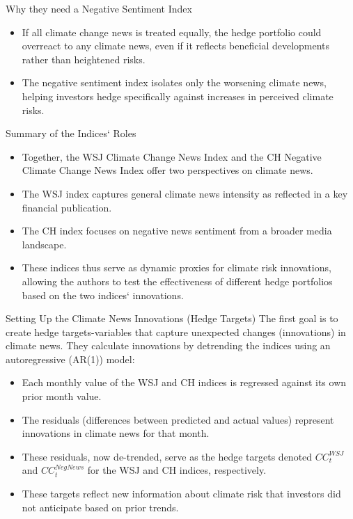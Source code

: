 \documentclass[11pt]{beamer}
\begin{document}
\begin{frame}{Why they need a Negative Sentiment Index}
	\begin{itemize}
		\item If all climate change news is treated equally, the hedge portfolio could overreact to any climate news, even if it reflects beneficial developments rather than heightened risks.

		\item The negative sentiment index isolates only the worsening climate news, helping investors hedge specifically against increases in perceived climate risks.
	\end{itemize}
\end{frame}
\begin{frame}{Summary of the Indices` Roles}
	\begin{itemize}
		\item Together, the WSJ Climate Change News Index and the CH Negative Climate Change News Index offer two perspectives on climate news.

		\item The WSJ index captures general climate news intensity as reflected in a key financial publication.

		\item The CH index focuses on negative news sentiment from a broader media landscape.

		\item These indices thus serve as dynamic proxies for climate risk innovations, allowing the authors to test the effectiveness of different hedge portfolios based on the two indices` innovations.
	\end{itemize}
\end{frame}
\begin{frame}{Setting Up the Climate News Innovations (Hedge Targets)}
The first goal is to create hedge targets-variables that capture unexpected changes (innovations) in climate news. They calculate innovations by detrending the indices using an autoregressive (AR(1)) model:

	\begin{itemize}
		\item Each monthly value of the WSJ and CH indices is regressed against its own prior month value.

		\item The residuals (differences between predicted and actual values) represent innovations in climate news for that month.

		\item These residuals, now de-trended, serve as the hedge targets denoted $CC_t^{WSJ}$ and $CC_t^{NegNews}$ for the WSJ and CH indices, respectively. 

		\item These targets reflect new information about climate risk that investors did not anticipate based on prior trends.
	\end{itemize}
\end{frame}
\end{document}
